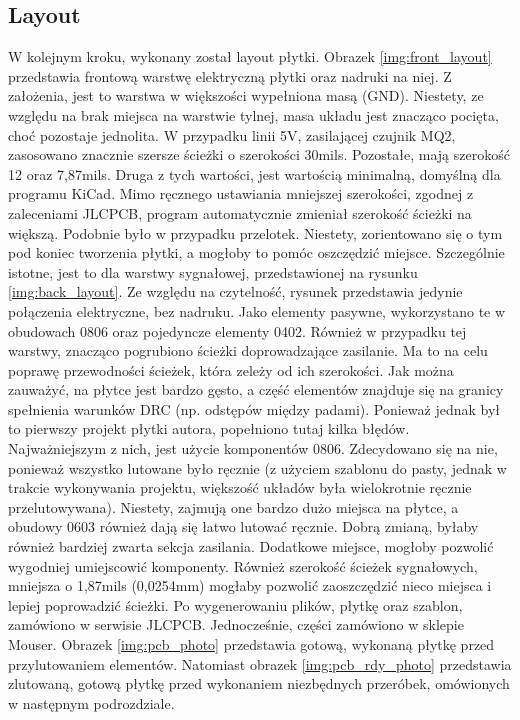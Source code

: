 \subsection{Layout}
W kolejnym kroku, wykonany został layout płytki. Obrazek \ref{img:front_layout} przedstawia frontową warstwę elektryczną płytki oraz nadruki na niej. Z założenia, jest to warstwa w większości wypełniona masą (GND). Niestety, ze względu na brak miejsca na warstwie tylnej, masa układu jest znacząco pocięta, choć pozostaje jednolita. W przypadku linii 5V, zasilającej czujnik MQ2, zasosowano znacznie szersze ścieżki o szerokości 30mils. Pozostałe, mają szerokość 12 oraz 7,87mils. Druga z tych wartości, jest wartością minimalną, domyślną dla programu KiCad. Mimo ręcznego ustawiania mniejszej szerokości, zgodnej z zaleceniami JLCPCB\cite{jlcpcb_specification}, program automatycznie zmieniał szerokość ścieżki na większą. Podobnie było w przypadku przelotek. Niestety, zorientowano się o tym pod koniec tworzenia płytki, a mogłoby to pomóc oszczędzić miejsce. Szczególnie istotne, jest to dla warstwy sygnałowej, przedstawionej na rysunku \ref{img:back_layout}. Ze względu na czytelność, rysunek przedstawia jedynie połączenia elektryczne, bez nadruku. Jako elementy pasywne, wykorzystano te w obudowach 0806 oraz pojedyncze elementy 0402. Również w przypadku tej warstwy, znacząco pogrubiono ścieżki doprowadzające zasilanie. Ma to na celu poprawę przewodności ścieżek, która zeleży od ich szerokości. Jak można zauważyć, na płytce jest bardzo gęsto, a część elementów znajduje się na granicy spełnienia warunków DRC (np. odstępów między padami). Ponieważ jednak był to pierwszy projekt płytki autora, popełniono tutaj kilka błędów. Najważniejszym z nich, jest użycie komponentów 0806. Zdecydowano się na nie, ponieważ wszystko lutowane było ręcznie (z użyciem szablonu do pasty, jednak w trakcie wykonywania projektu, większość układów była wielokrotnie ręcznie przelutowywana). Niestety, zajmują one bardzo dużo miejsca na płytce, a obudowy 0603 również dają się łatwo lutować ręcznie. Dobrą zmianą, byłaby również bardziej zwarta sekcja zasilania. Dodatkowe miejsce, mogłoby pozwolić wygodniej umiejscowić komponenty. Również szerokość ścieżek sygnałowych, mniejsza o 1,87mils (0,0254mm) mogłaby pozwolić zaoszczędzić nieco miejsca i lepiej poprowadzić ścieżki.
\newline
Po wygenerowaniu plików, płytkę oraz szablon, zamówiono w serwisie JLCPCB. Jednocześnie, części zamówiono w sklepie Mouser. Obrazek \ref{img:pcb_photo} przedstawia gotową, wykonaną płytkę przed przylutowaniem elementów. Natomiast obrazek \ref{img:pcb_rdy_photo} przedstawia zlutowaną, gotową płytkę przed wykonaniem niezbędnych przeróbek, omówionych w następnym podrozdziale. 

